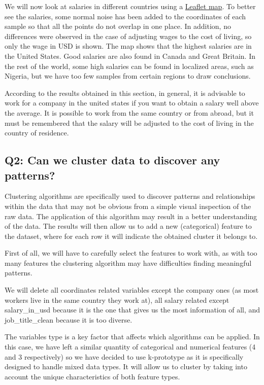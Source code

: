 \documentclass[
]{article}
\begin{document}
\scriptsize

\normalsize

We will now look at salaries in different countries using a
\href{https://rstudio.github.io/leaflet/}{Leaflet map}. To better see
the salaries, some normal noise has been added to the coordinates of
each sample so that all the points do not overlap in one place. In
addition, no differences were observed in the case of adjusting wages to
the cost of living, so only the wage in USD is shown. The map shows that
the highest salaries are in the United States. Good salaries are also
found in Canada and Great Britain. In the rest of the world, some high
salaries can be found in localized areas, such as Nigeria, but we have
too few samples from certain regions to draw conclusions.

According to the results obtained in this section, in general, it is
advisable to work for a company in the united states if you want to
obtain a salary well above the average. It is possible to work from the
same country or from abroad, but it must be remembered that the salary
will be adjusted to the cost of living in the country of residence.

\hypertarget{q2-can-we-cluster-data-to-discover-any-patterns}{%
\subsection{Q2: Can we cluster data to discover any
patterns?}\label{q2-can-we-cluster-data-to-discover-any-patterns}}

Clustering algorithms are specifically used to discover patterns and
relationships within the data that may not be obvious from a simple
visual inspection of the raw data. The application of this algorithm may
result in a better understanding of the data. The results will then
allow us to add a new (categorical) feature to the dataset, where for
each row it will indicate the obtained cluster it belongs to.

First of all, we will have to carefully select the features to work
with, as with too many features the clustering algorithm may have
difficulties finding meaningful patterns.

We will delete all coordinates related variables except the company ones
(as most workers live in the same country they work at), all salary
related except salary\_in\_usd because it is the one that gives us the
most information of all, and job\_title\_clean because it is too
diverse.

The variables type is a key factor that affects which algorithms can be
applied. In this case, we have left a similar quantity of categorical
and numerical features (4 and 3 respectively) so we have decided to use
k-prototype as it is specifically designed to handle mixed data types.
It will allow us to cluster by taking into account the unique
characteristics of both feature types.
\end{document}
